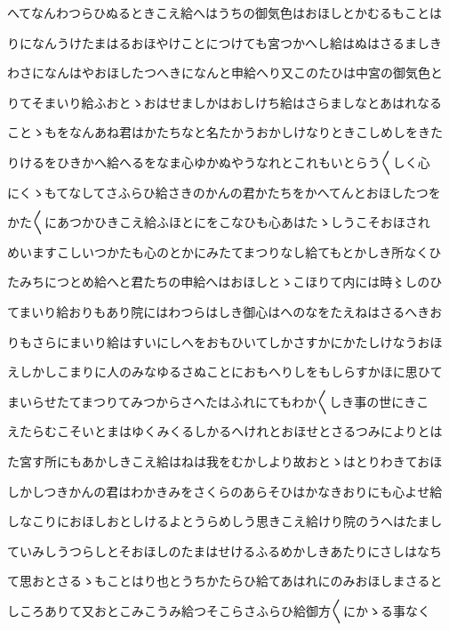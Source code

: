 \documentclass[a4paper,11pt,landscape]{ltjtarticle}
\begin{document}
\par\medskip
へてなんわつらひぬるときこえ給へはうちの御気色はおほしとかむるもことは
\par\medskip
りになんうけたまはるおほやけことにつけても宮つかへし給はぬはさるましき
\par\medskip
わさになんはやおほしたつへきになんと申給へり又このたひは中宮の御気色と
\par\medskip
りてそまいり給ふおとゝおはせましかはおしけち給はさらましなとあはれなる
\par\medskip
ことゝもをなんあね君はかたちなと名たかうおかしけなりときこしめしをきた
\par\medskip
りけるをひきかへ給へるをなま心ゆかぬやうなれとこれもいとらう〱しく心
\par\medskip
にくゝもてなしてさふらひ給さきのかんの君かたちをかへてんとおほしたつを
\par\medskip
かた〱にあつかひきこえ給ふほとにをこなひも心あはたゝしうこそおほされ
\par\medskip
めいますこしいつかたも心のとかにみたてまつりなし給てもとかしき所なくひ
\par\medskip
たみちにつとめ給へと君たちの申給へはおほしとゝこほりて内には時〻しのひ
\par\medskip
てまいり給おりもあり院にはわつらはしき御心はへのなをたえねはさるへきお
\par\medskip
りもさらにまいり給はすいにしへをおもひいてしかさすかにかたしけなうおほ
\par\medskip
えしかしこまりに人のみなゆるさぬことにおもへりしをもしらすかほに思ひて
\par\medskip
まいらせたてまつりてみつからさへたはふれにてもわか〱しき事の世にきこ
\par\medskip
えたらむこそいとまはゆくみくるしかるへけれとおほせとさるつみによりとは
\par\medskip
た宮す所にもあかしきこえ給はねは我をむかしより故おとゝはとりわきておほ
\par\medskip
しかしつきかんの君はわかきみをさくらのあらそひはかなきおりにも心よせ給
\par\medskip
しなこりにおほしおとしけるよとうらめしう思きこえ給けり院のうへはたまし
\par\medskip
ていみしうつらしとそおほしのたまはせけるふるめかしきあたりにさしはなち
\par\medskip
て思おとさるゝもことはり也とうちかたらひ給てあはれにのみおほしまさると
\par\medskip
しころありて又おとこみこうみ給つそこらさふらひ給御方〱にかゝる事なく
\par\medskip
\end{document}
